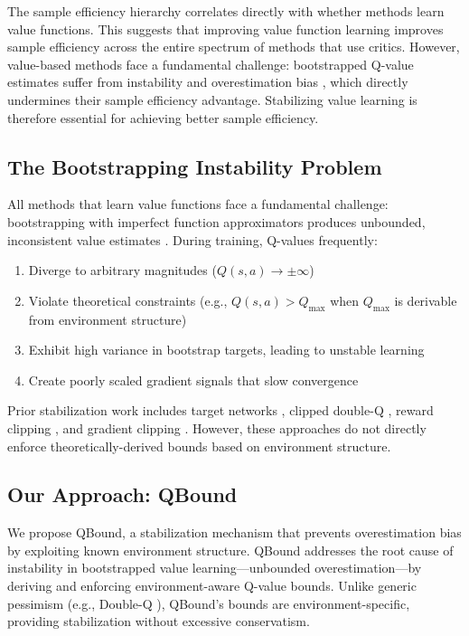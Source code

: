 \documentclass[11pt]{article}
\theoremstyle{definition}
\theoremstyle{remark}
\begin{document}
The sample efficiency hierarchy correlates directly with whether methods learn value functions. This suggests that improving value function learning improves sample efficiency across the entire spectrum of methods that use critics. However, value-based methods face a fundamental challenge: bootstrapped Q-value estimates suffer from instability and overestimation bias \citep{thrun1993issues, van2016deep}, which directly undermines their sample efficiency advantage. Stabilizing value learning is therefore essential for achieving better sample efficiency.

\subsection{The Bootstrapping Instability Problem}

All methods that learn value functions face a fundamental challenge: bootstrapping with imperfect function approximators produces unbounded, inconsistent value estimates \citep{tsitsiklis1997analysis}. During training, Q-values frequently:
\begin{enumerate}
    \item Diverge to arbitrary magnitudes ($Q(s,a) \to \pm\infty$)
    \item Violate theoretical constraints (e.g., $Q(s,a) > Q_{\max}$ when $Q_{\max}$ is derivable from environment structure)
    \item Exhibit high variance in bootstrap targets, leading to unstable learning
    \item Create poorly scaled gradient signals that slow convergence
\end{enumerate}

Prior stabilization work includes target networks \citep{mnih2015human}, clipped double-Q \citep{fujimoto2018addressing}, reward clipping \citep{mnih2013playing}, and gradient clipping \citep{pascanu2013difficulty}. However, these approaches do not directly enforce theoretically-derived bounds based on environment structure.

\subsection{Our Approach: QBound}

We propose QBound, a stabilization mechanism that prevents overestimation bias by exploiting known environment structure. QBound addresses the root cause of instability in bootstrapped value learning—unbounded overestimation—by deriving and enforcing environment-aware Q-value bounds. Unlike generic pessimism (e.g., Double-Q \citep{van2016deep}), QBound's bounds are environment-specific, providing stabilization without excessive conservatism.
\end{document}
